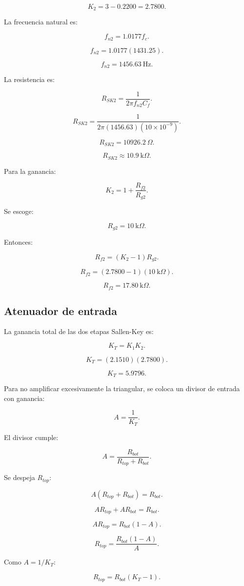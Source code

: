 \documentclass[11pt,letterpaper]{article}
\begin{document}
\[
K_2=3-0.2200=2.7800.
\]

La frecuencia natural es:

\[
f_{n2}=1.0177f_c.
\]

\[
f_{n2}=1.0177(1431.25).
\]

\[
f_{n2}=1456.63~\text{Hz}.
\]

La resistencia es:

\[
R_{SK2}=
\frac{1}{2\pi f_{n2}C_f}.
\]

\[
R_{SK2}=
\frac{1}
{2\pi(1456.63)(10\times 10^{-9})}.
\]

\[
R_{SK2}=10926.2~\Omega.
\]

\[
\boxed{R_{SK2}\approx 10.9~\text{k}\Omega}.
\]

Para la ganancia:

\[
K_2=1+\frac{R_{f2}}{R_{g2}}.
\]

Se escoge:

\[
R_{g2}=10~\text{k}\Omega.
\]

Entonces:

\[
R_{f2}=(K_2-1)R_{g2}.
\]

\[
R_{f2}=(2.7800-1)(10~\text{k}\Omega).
\]

\[
R_{f2}=17.80~\text{k}\Omega.
\]

\subsection{Atenuador de entrada}

La ganancia total de las dos etapas Sallen-Key es:

\[
K_T=K_1K_2.
\]

\[
K_T=(2.1510)(2.7800).
\]

\[
K_T=5.9796.
\]

Para no amplificar excesivamente la triangular, se coloca un divisor de entrada
con ganancia:

\[
A=\frac{1}{K_T}.
\]

El divisor cumple:

\[
A=\frac{R_{bot}}{R_{top}+R_{bot}}.
\]

Se despeja \(R_{top}\):

\[
A(R_{top}+R_{bot})=R_{bot}.
\]

\[
AR_{top}+AR_{bot}=R_{bot}.
\]

\[
AR_{top}=R_{bot}(1-A).
\]

\[
R_{top}=\frac{R_{bot}(1-A)}{A}.
\]

Como \(A=1/K_T\):

\[
R_{top}=R_{bot}(K_T-1).
\]
\end{document}
